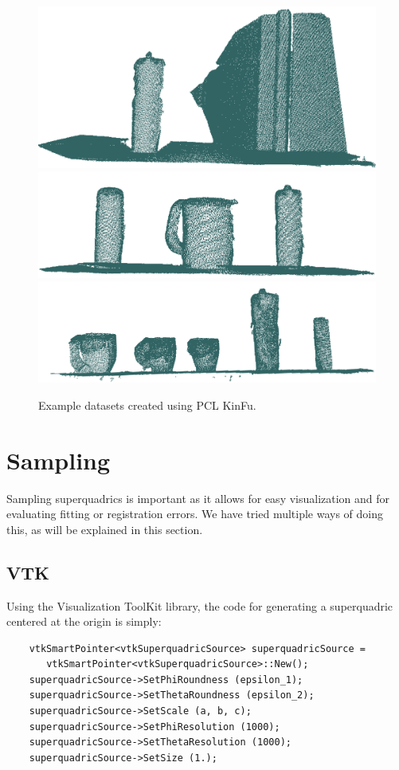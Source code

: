\documentclass{article}
\begin{document}
\begin{figure}
\centering
\includegraphics[width=0.3\columnwidth]{figures/kinfu_1}
\includegraphics[width=0.3\columnwidth]{figures/kinfu_2}
\includegraphics[width=0.3\columnwidth]{figures/kinfu_3}
\caption {Example datasets created using PCL KinFu.}
\label{fig:kinfu_datasets}
\end{figure}
		
		
		
	


\section {Sampling}
\label{sec:sampling}

Sampling superquadrics is important as it allows for easy visualization and for evaluating fitting or registration errors. We have tried multiple ways of doing this, as will be explained in this section.

\subsection {VTK}

Using the Visualization ToolKit library, the code for generating a superquadric centered at the origin is simply:

\begin{verbatim}
    vtkSmartPointer<vtkSuperquadricSource> superquadricSource = 
       vtkSmartPointer<vtkSuperquadricSource>::New();
    superquadricSource->SetPhiRoundness (epsilon_1);
    superquadricSource->SetThetaRoundness (epsilon_2);
    superquadricSource->SetScale (a, b, c);
    superquadricSource->SetPhiResolution (1000);
    superquadricSource->SetThetaResolution (1000);
    superquadricSource->SetSize (1.);
\end{verbatim}
\end{document}
